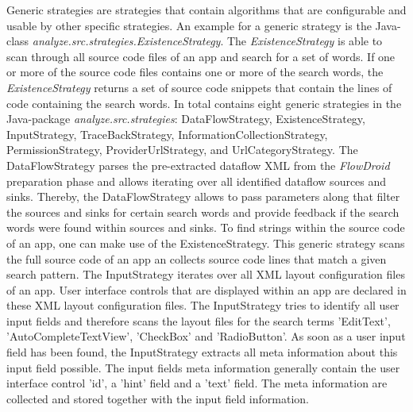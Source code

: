 Generic strategies are strategies that contain algorithms that are configurable and usable by other specific strategies.
An example for a generic strategy is the Java-class \textit{analyze.src.strategies.ExistenceStrategy}. 
The \textit{ExistenceStrategy} is able to scan through all source code files of an app and search for a set of words.
If one or more of the source code files contains one or more of the search words, the \textit{ExistenceStrategy} returns a set of source code snippets that contain the lines of code containing the search words.
In total \AIPRAT contains eight generic strategies in the Java-package \textit{analyze.src.strategies}: DataFlowStrategy, ExistenceStrategy, InputStrategy, TraceBackStrategy, InformationCollectionStrategy, PermissionStrategy, ProviderUrlStrategy, and UrlCategoryStrategy.
The DataFlowStrategy parses the pre-extracted dataflow \acs{XML} from the \textit{FlowDroid} preparation phase and allows iterating over all identified dataflow sources and sinks.
Thereby, the DataFlowStrategy allows to pass parameters along that filter the sources and sinks for certain search words and provide feedback if the search words were found within sources and sinks.
To find strings within the source code of an app, one can make use of the ExistenceStrategy. 
This generic strategy scans the full source code of an app an collects source code lines that match a given search pattern.
The InputStrategy iterates over all \acs{XML} layout configuration files of an app. 
User interface controls that are displayed within an app are declared in these \acs{XML} layout configuration files.
The InputStrategy tries to identify all user input fields and therefore scans the layout files for the search terms 'EditText', 'AutoCompleteTextView', 'CheckBox' and 'RadioButton'.
As soon as a user input field has been found, the InputStrategy extracts all meta information about this input field possible.
The input fields meta information generally contain the user interface control 'id', a 'hint' field and a 'text' field. 
The meta information are collected and stored together with the input field information.

